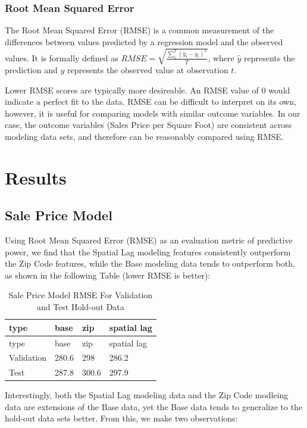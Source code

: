 \documentclass[]{article}
\begin{document}
\subsubsection{Root Mean Squared Error}\label{root-mean-squared-error}

The Root Mean Squared Error (RMSE) is a common measurement of the
differences between values predicted by a regression model and the
observed values. It is formally defined as
\(RMSE = \sqrt{ \frac{\sum_{1}^{T} (\hat{y}_t - y_t)^2}{T} }\), where
\(\hat{y}\) represents the prediction and \(y\) represents the observed
value at observation \(t\).

Lower RMSE scores are typically more desireable. An RMSE value of 0
would indicate a perfect fit to the data. RMSE can be difficult to
interpret on its own, however, it is useful for comparing models with
similar outcome variables. In our case, the outcome variables (Sales
Price per Square Foot) are consistent across modeling data sets, and
therefore can be reasonably compared using RMSE.

\section{Results}\label{results}

\subsection{Sale Price Model}\label{sale-price-model}

Using Root Mean Squared Error (RMSE) as an evaluation metric of
predictive power, we find that the Spatial Lag modeling features
consistently outperform the Zip Code features, while the Base modeling
data tends to outperform both, as shown in the following Table (lower
RMSE is better):

\begin{longtable}[]{@{}llll@{}}
\caption{Sale Price Model RMSE For Validation and Test Hold-out
Data}\tabularnewline
\toprule
type & base & zip & spatial lag\tabularnewline
\midrule
\endfirsthead
\toprule
type & base & zip & spatial lag\tabularnewline
\midrule
\endhead
Validation & 280.6 & 298 & 286.2\tabularnewline
Test & 287.8 & 300.6 & 297.9\tabularnewline
\bottomrule
\end{longtable}

Interestingly, both the Spatial Lag modeling data and the Zip Code
modleing data are extensions of the Base data, yet the Base data tends
to generalize to the hold-out data sets better. From this, we make two
observations:
\end{document}
